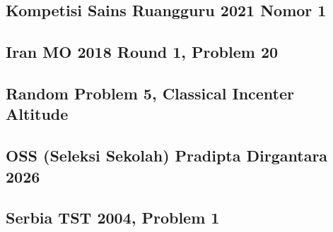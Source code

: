 \subsection{Kompetisi Sains Ruangguru 2021 Nomor 1}


\subsection{Iran MO 2018 Round 1, Problem 20}


\subsection{Random Problem 5, Classical Incenter Altitude}


\subsection{OSS (Seleksi Sekolah) Pradipta Dirgantara 2026}


\subsection{Serbia TST 2004, Problem 1}
